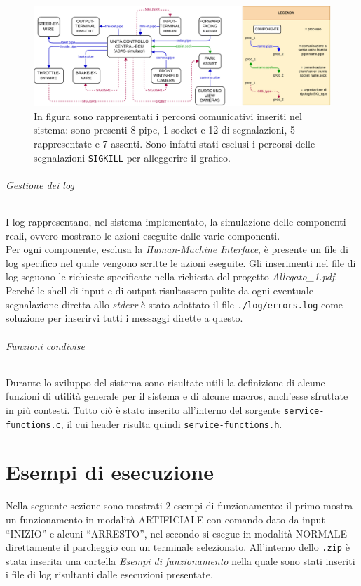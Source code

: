 \documentclass[11pt, openany]{article}
\theoremstyle{definition}
\theoremstyle{plain}
\theoremstyle{remark}
\begin{document}
			\begin{figure}[t]
				\includegraphics[scale=0.9, center]{./include/SO_Progetto_Diagrammi-Comunicazione.pdf}
				\caption{In figura sono rappresentati i percorsi comunicativi inseriti nel sistema: sono presenti 8 pipe, 1 socket e 12 di segnalazioni, 5 rappresentate e 7 assenti. Sono infatti stati esclusi i percorsi delle segnalazioni \texttt{SIGKILL} per alleggerire il grafico.}
				\label{fig:comunicazione}
			\end{figure}
			\normalsize
		\paragraph{Gestione dei log}
			I log rappresentano, nel sistema implementato, la simulazione delle componenti reali, ovvero mostrano le azioni eseguite dalle varie componenti.\\
			Per ogni componente, esclusa la \textit{Human-Machine Interface}, è presente un file di log specifico nel quale vengono scritte le azioni eseguite.
			Gli inserimenti nel file di log seguono le richieste specificate nella richiesta del progetto \textit{Allegato\_1.pdf}.
			Perché le shell di input e di output risultassero pulite da ogni eventuale segnalazione diretta allo \textit{stderr} è stato adottato il file \texttt{./log/errors.log} come soluzione per inserirvi tutti i messaggi dirette a questo.

		\paragraph{Funzioni condivise}
			Durante lo sviluppo del sistema sono risultate utili la definizione di alcune funzioni di utilità generale per il sistema e di alcune macros, anch'esse sfruttate in più contesti. Tutto ciò è stato inserito all'interno del sorgente \texttt{service-functions.c}, il cui header risulta quindi \texttt{service-functions.h}.

	\part{Esempi di esecuzione}
		Nella seguente sezione sono mostrati 2 esempi di funzionamento: il primo mostra un funzionamento in modalità ARTIFICIALE con comando dato da input ``INIZIO'' e alcuni ``ARRESTO'', nel secondo si esegue in modalità NORMALE direttamente il parcheggio con un terminale selezionato. All'interno dello \texttt{.zip} è stata  inserita una cartella \textit{Esempi di funzionamento} nella quale sono stati inseriti i file di log risultanti dalle esecuzioni presentate.
\end{document}
